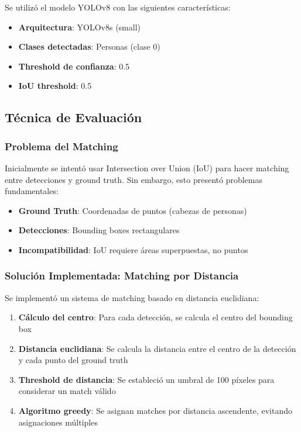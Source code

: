 \documentclass[12pt,a4paper]{article}
\begin{document}
Se utilizó el modelo YOLOv8 con las siguientes características:
\begin{itemize}
    \item \textbf{Arquitectura}: YOLOv8s (small)
    \item \textbf{Clases detectadas}: Personas (clase 0)
    \item \textbf{Threshold de confianza}: 0.5
    \item \textbf{IoU threshold}: 0.5
\end{itemize}

\subsection{Técnica de Evaluación}

\subsubsection{Problema del Matching}

Inicialmente se intentó usar Intersection over Union (IoU) para hacer matching entre detecciones y ground truth. Sin embargo, esto presentó problemas fundamentales:

\begin{itemize}
    \item \textbf{Ground Truth}: Coordenadas de puntos (cabezas de personas)
    \item \textbf{Detecciones}: Bounding boxes rectangulares
    \item \textbf{Incompatibilidad}: IoU requiere áreas superpuestas, no puntos
\end{itemize}

\subsubsection{Solución Implementada: Matching por Distancia}

Se implementó un sistema de matching basado en distancia euclidiana:

\begin{enumerate}
    \item \textbf{Cálculo del centro}: Para cada detección, se calcula el centro del bounding box
    \item \textbf{Distancia euclidiana}: Se calcula la distancia entre el centro de la detección y cada punto del ground truth
    \item \textbf{Threshold de distancia}: Se estableció un umbral de 100 píxeles para considerar un match válido
    \item \textbf{Algoritmo greedy}: Se asignan matches por distancia ascendente, evitando asignaciones múltiples
\end{enumerate}
\end{document}
